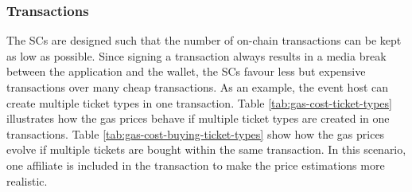 \subsubsection{Transactions}
The SCs are designed such that the number of on-chain transactions can be kept as low as possible. Since signing a transaction always results in a media break between the application and the wallet, the SCs favour less but expensive transactions over many cheap transactions. As an example, the event host can create multiple ticket types in one transaction. Table \ref{tab:gas-cost-ticket-types} illustrates how the gas prices behave if multiple ticket types are created in one transactions. Table \ref{tab:gas-cost-buying-ticket-types} show how the gas prices evolve if multiple tickets are bought within the same transaction. In this scenario, one affiliate is included in the transaction to make the price estimations more realistic.

